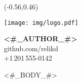 \documentclass[12pt,american,nohyper,a4paper,sfsidenotes]{tufte-handout}
\begin{document}
\par
{}\par
\bigskip
{}
\normalsize

\fancyhead[RE,RO]{}
\fancyfoot[RE,RO]{\smallcaps{\newlinetospace{}}\quad\thepage}%

\begin{textblock}{15}(-0.56,0.46)
\begin{flushright}

\texttt{[image: img/logo.pdf]}
 
\bigskip

\textsf{
\textbf{<#_AUTHOR_#>}\\
github.com/relikd\\
+1\,201\,555-0142
}
\end{flushright}
\end{textblock}
\setlength{\parindent}{0pt}

<#_BODY_#>
\end{document}
